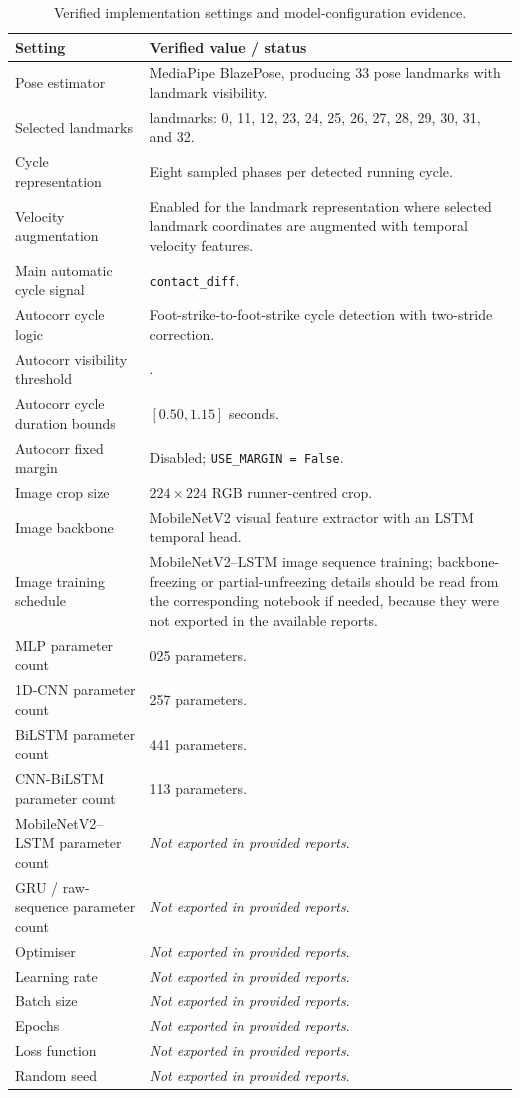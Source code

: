 \begin{table}[htbp]
\centering
\caption{Verified implementation settings and model-configuration evidence.}
\label{tab:hyperparams}
\renewcommand{\arraystretch}{1.18}
\scriptsize
\begin{tabularx}{\textwidth}{
>{\raggedright\arraybackslash}p{}
>{\raggedright\arraybackslash}X}
\toprule
Setting & Verified value / status \\
\midrule
Pose estimator & MediaPipe BlazePose, producing 33 pose landmarks with landmark visibility. \\
Selected landmarks & 13 landmarks: 0, 11, 12, 23, 24, 25, 26, 27, 28, 29, 30, 31, and 32. \\
Cycle representation & Eight sampled phases per detected running cycle. \\
Velocity augmentation & Enabled for the landmark representation where selected landmark coordinates are augmented with temporal velocity features. \\
Main automatic cycle signal & \texttt{contact\_diff}. \\
Autocorr cycle logic & Foot-strike-to-foot-strike cycle detection with two-stride correction. \\
Autocorr visibility threshold & 0.45. \\
Autocorr cycle duration bounds & $[0.50, 1.15]$ seconds. \\
Autocorr fixed margin & Disabled; \texttt{USE\_MARGIN = False}. \\
Image crop size & $224 \times 224$ RGB runner-centred crop. \\
Image backbone & MobileNetV2 visual feature extractor with an LSTM temporal head. \\
Image training schedule & MobileNetV2--LSTM image sequence training; backbone-freezing or partial-unfreezing details should be read from the corresponding notebook if needed, because they were not exported in the available reports. \\
MLP parameter count & 193{,}025 parameters. \\
1D-CNN parameter count & 40{,}257 parameters. \\
BiLSTM parameter count & 173{,}441 parameters. \\
CNN-BiLSTM parameter count & 82{,}113 parameters. \\
MobileNetV2--LSTM parameter count & \textit{Not exported in provided reports}. \\
GRU / raw-sequence parameter count & \textit{Not exported in provided reports}. \\
Optimiser & \textit{Not exported in provided reports}. \\
Learning rate & \textit{Not exported in provided reports}. \\
Batch size & \textit{Not exported in provided reports}. \\
Epochs & \textit{Not exported in provided reports}. \\
Loss function & \textit{Not exported in provided reports}. \\
Random seed & \textit{Not exported in provided reports}. \\
\bottomrule
\end{tabularx}


\end{table}
